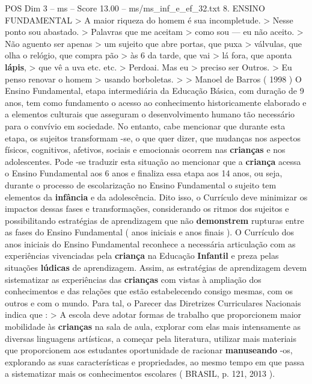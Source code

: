 \begin{textsample}{POS Dim 3 – ms – Score 13.00 – ms/ms\_inf\_e\_ef\_32.txt}  \label{ex:f3_pos_198}
8.
ENSINO FUNDAMENTAL > A maior riqueza do homem é sua incompletude. > Nesse ponto sou abastado. > Palavras que me aceitam > como sou — eu não aceito. > Não aguento ser apenas > um sujeito que abre portas, que puxa > válvulas, que olha o relógio, que compra pão > às 6 da tarde, que vai > lá fora, que aponta \textbf{lápis}, > que vê a uva etc. etc. > Perdoai.
Mas eu > preciso ser Outros. > Eu penso renovar o homem > usando borboletas. > > Manoel de Barros ( 1998 ) O Ensino Fundamental, etapa intermediária da Educação Básica, com duração de 9 anos, tem como fundamento o acesso ao conhecimento historicamente elaborado e a elementos culturais que asseguram o desenvolvimento humano tão necessário para o convívio em sociedade.
No entanto, cabe mencionar que durante esta etapa, os sujeitos transformam -se, o que quer dizer, que mudanças nos aspectos físicos, cognitivos, afetivos, sociais e emocionais ocorrem nas \textbf{crianças} e nos adolescentes.
Pode -se traduzir esta situação ao mencionar que a \textbf{criança} acessa o Ensino Fundamental aos 6 anos e finaliza essa etapa aos 14 anos, ou seja, durante o processo de escolarização no Ensino Fundamental o sujeito tem elementos da \textbf{infância} e da adolescência.
Dito isso, o Currículo deve minimizar os impactos dessas fases e transformações, considerando os ritmos dos sujeitos e possibilitando estratégias de aprendizagem que não \textbf{demonstrem} rupturas entre as fases do Ensino Fundamental ( anos iniciais e anos finais ).
O Currículo dos anos iniciais do Ensino Fundamental reconhece a necessária articulação com as experiências vivenciadas pela \textbf{criança} na Educação \textbf{Infantil} e preza pelas situações \textbf{lúdicas} de aprendizagem.
Assim, as estratégias de aprendizagem devem sistematizar as experiências das \textbf{crianças} com vistas à ampliação dos conhecimentos e das relações que estão estabelecendo consigo mesmas, com os outros e com o mundo.
Para tal, o Parecer das Diretrizes Curriculares Nacionais indica que : > A escola deve adotar formas de trabalho que proporcionem maior mobilidade às \textbf{crianças} na sala de aula, explorar com elas mais intensamente as diversas linguagens artísticas, a começar pela literatura, utilizar mais materiais que proporcionem aos estudantes oportunidade de racionar \textbf{manuseando} -os, explorando as suas características e propriedades, ao mesmo tempo em que passa a sistematizar mais os conhecimentos escolares ( BRASIL, p. 121, 2013 ).

\end{textsample}
